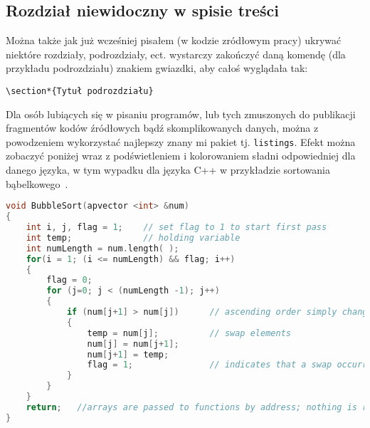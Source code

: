 \subsection*{Rozdział niewidoczny w spisie treści}
Można także jak już wcześniej pisałem (w kodzie zródłowym pracy) ukrywać niektóre rozdziały, podrozdziały, ect. wystarczy zakończyć daną komendę (dla przykładu podrozdziału) znakiem gwiazdki, aby całoś wyglądała tak:

\begin{verbatim}
\section*{Tytuł podrozdziału}
\end{verbatim}



Dla osób lubiących się w pisaniu programów, lub tych zmuszonych do publikacji fragmentów kodów źródłowych bądź skomplikowanych danych, można z powodzeniem wykorzystać najlepszy znany mi pakiet tj. \texttt{listings}. Efekt można zobaczyć poniżej wraz z podświetleniem i kolorowaniem sładni odpowiedniej dla danego języka, w tym wypadku dla języka C++ w przykładzie sortowania bąbelkowego~\parencite{url:cpp-bubble-sort}.

\begin{lstlisting}[label=lst:cpp-bubble-sort, caption=Sortowanie bąbelkowe w C++, language=C++]
void BubbleSort(apvector <int> &num)
{
    int i, j, flag = 1;    // set flag to 1 to start first pass
    int temp;              // holding variable
    int numLength = num.length( ); 
    for(i = 1; (i <= numLength) && flag; i++)
    {
        flag = 0;
        for (j=0; j < (numLength -1); j++)
        {
            if (num[j+1] > num[j])      // ascending order simply changes to <
            { 
                temp = num[j];          // swap elements
                num[j] = num[j+1];
                num[j+1] = temp;
                flag = 1;               // indicates that a swap occurred.
            }
        }
    }
    return;   //arrays are passed to functions by address; nothing is returned
}
\end{lstlisting}